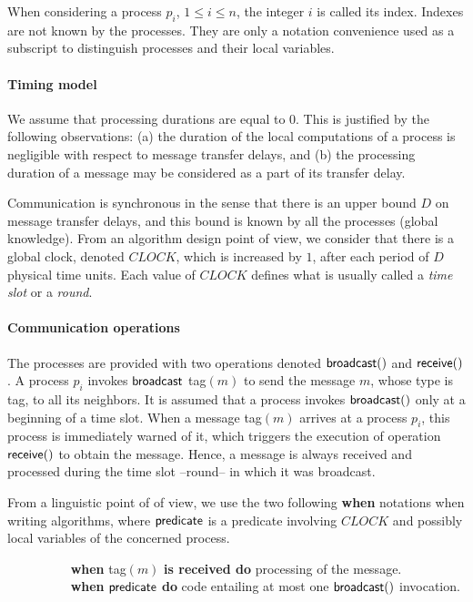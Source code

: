 \documentclass[11pt,english]{article}
\newcommand{\CLOCK}{\mathit{CLOCK}}
\begin{document}
When considering a process $p_i$, $1 \leq i \leq n$, the integer $i$ 
is called its index. Indexes are not known by the processes. 
They are only a notation convenience used as a subscript 
to distinguish processes and their local variables. 


\paragraph{Timing model}
We assume that processing durations are equal to $0$. This is
justified by the following observations: (a) the duration of the local
computations of a process is negligible with respect to message
transfer delays, and (b) the processing duration of a message may be
considered as a part of its transfer delay.

Communication is synchronous in the sense that there is an upper bound
$D$ on message transfer delays, and this bound is known by all the
processes (global knowledge). From an algorithm design point of view,
we consider that there is a global clock, denoted $\CLOCK$, which is
increased by $1$, after each period of $D$ physical time units. 
Each value of $\CLOCK$ defines what is usually called a {\it time slot}
or a {\it round}.



\paragraph{Communication operations}
The processes are provided with two operations denoted ${\sf
  broadcast}()$ and ${\sf receive}()$.  A process $p_i$ invokes ${\sf
  broadcast}$ {\sc tag}$(m)$ to send the message $m$, whose type is
{\sc tag}, to all its neighbors.  It is assumed that a process invokes
${\sf broadcast}()$ only at a beginning of a time slot.  When a
message {\sc tag}$(m)$ arrives at a process $p_i$, this process is
immediately warned of it, which triggers the execution of operation
${\sf receive}()$ to obtain the message. Hence, a message is always
received and processed during the time slot --round-- in which it was
broadcast.

From a linguistic point of of view, we use the two following
{\bf when} notations when writing algorithms, where ${\sf predicate}$ 
is a predicate involving $\CLOCK$ and possibly local variables of the
concerned process.  
\begin{tabbing} 
$~~~~~~~~~~~~~~~~~~~~~$
{\bf  when} {\sc  tag}$(m)$ {\bf  is received do} processing of the message. \\
$~~~~~~~~~~~~~~~~~~~~~$
{\bf  when} ${\sf predicate}$ 
                         {\bf do} code entailing at most one ${\sf broadcast}()$
invocation. 
\end{tabbing}
\end{document}
